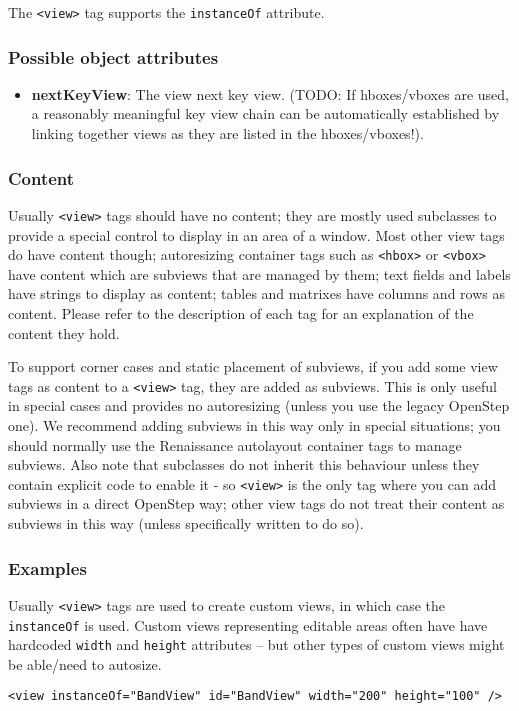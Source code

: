The \texttt{<view>} tag supports the \texttt{instanceOf} attribute.

\subsubsection{Possible object attributes}
\begin{itemize}
\item {\bf nextKeyView}: The view next key view.  (TODO: If
  hboxes/vboxes are used, a reasonably meaningful key view chain can
  be automatically established by linking together views as they are
  listed in the hboxes/vboxes!).
\end{itemize}

\subsubsection{Content}
Usually \texttt{<view>} tags should have no content; they are mostly
used subclasses to provide a special control to display in an area of
a window.  Most other view tags do have content though; autoresizing
container tags such as \texttt{<hbox>} or \texttt{<vbox>} have content
which are subviews that are managed by them; text fields and labels
have strings to display as content; tables and matrixes have columns
and rows as content.  Please refer to the description of each tag for
an explanation of the content they hold.

To support corner cases and static placement of subviews, if you add
some view tags as content to a \texttt{<view>} tag, they are added as
subviews.  This is only useful in special cases and provides no
autoresizing (unless you use the legacy OpenStep one).  We recommend
adding subviews in this way only in special situations; you should
normally use the Renaissance autolayout container tags to manage
subviews.  Also note that subclasses do not inherit this behaviour
unless they contain explicit code to enable it - so \texttt{<view>} is
the only tag where you can add subviews in a direct OpenStep way;
other view tags do not treat their content as subviews in this way
(unless specifically written to do so).

\subsubsection{Examples}
Usually \texttt{<view>} tags are used to create custom views, in which
case the \texttt{instanceOf} is used.  Custom views representing
editable areas often have have hardcoded \texttt{width} and
\texttt{height} attributes -- but other types of custom views might
be able/need to autosize.
\begin{verbatim}
<view instanceOf="BandView" id="BandView" width="200" height="100" />
\end{verbatim}

